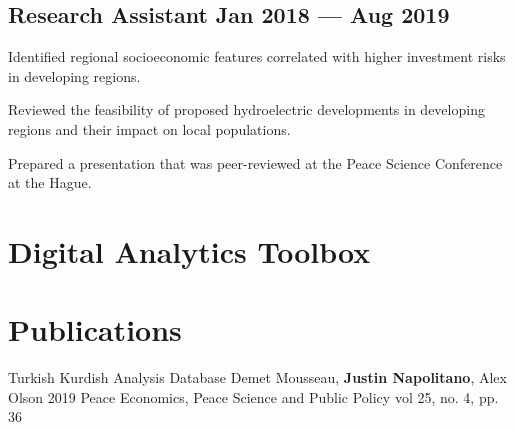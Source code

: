\documentclass[doublesided, paper=a4, fontsize=10.5pt]{my-resume}
\begin{document}
{    \subsection{Research Assistant \hfill Jan 2018 --- Aug 2019}
    \begin{zitemize}
        \item Identified regional socioeconomic features correlated with higher investment risks in developing regions.
        \item Reviewed the feasibility of proposed hydroelectric developments in developing regions and their impact on local populations.
        \item Prepared a presentation that was peer-reviewed at the Peace Science Conference at the Hague.
    \end{zitemize}

    \section{Digital Analytics Toolbox}

    \section{Publications} 
    \pubdefaultspacing
    \justinpublication
    {Turkish Kurdish Analysis Database} 
    {Demet Mousseau, \textbf{Justin Napolitano}, Alex Olson} 
    {2019} 
    {Peace Economics, Peace Science and Public Policy vol 25, no. 4, pp. 36} 
    {}
}

\makebody
\end{document}
